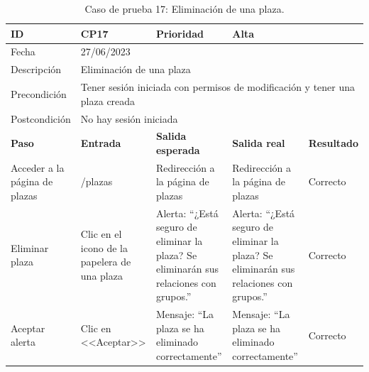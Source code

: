 \begin{table}[H]
\small
\begin{tabular}{p{} p{} p{} p{} p{}}
\cellcolor{gray!25}
ID   & CP17 & \cellcolor{gray!25} Prioridad   & Alta \\ \hline
\cellcolor{gray!25} Fecha	&	\multicolumn{4}{l}{27/06/2023} \\ \hline
\cellcolor{gray!25} Descripción		&	\multicolumn{4}{l}{Eliminación de una plaza} \\ \hline                                            
\cellcolor{gray!25}
Precondición  & \multicolumn{4}{p{.66\textwidth}}{Tener sesión iniciada con permisos de modificación y tener una plaza creada} \\ \hline
\cellcolor{gray!25} Postcondición & \multicolumn{4}{l}{No hay sesión iniciada}                                                    \\ \hline
\rowcolor{gray!25}
\textbf{Paso}   & \textbf{Entrada} & \textbf{Salida esperada} & \textbf{Salida real} & \textbf{Resultado} \\ \hline
Acceder a la página de plazas 
& /plazas                                                                          
& Redirección a la página de plazas                                   
& Redirección a la página de plazas                                   
& Correcto                            
\\ \hline
Eliminar plaza
& Clic en el icono de la papelera de una plaza
& Alerta: ``¿Está seguro de eliminar la plaza? Se eliminarán sus relaciones con grupos.''
& Alerta: ``¿Está seguro de eliminar la plaza? Se eliminarán sus relaciones con grupos.''
& Correcto
\\ \hline
Aceptar alerta
& Clic en <<Aceptar>>
& Mensaje: ``La plaza se ha eliminado correctamente'' 
& Mensaje: ``La plaza se ha eliminado correctamente'' 
& Correcto
\\ \hline             
\end{tabular}
\caption{Caso de prueba 17: Eliminación de una plaza.}\label{table:CP17}
\end{table}

